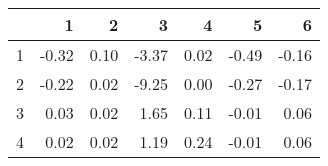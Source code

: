 \begin{table}[ht]
\centering
\begin{tabular}{rrrrrrr}
  \hline
 & 1 & 2 & 3 & 4 & 5 & 6 \\ 
  \hline
1 & -0.32 & 0.10 & -3.37 & 0.02 & -0.49 & -0.16 \\ 
  2 & -0.22 & 0.02 & -9.25 & 0.00 & -0.27 & -0.17 \\ 
  3 & 0.03 & 0.02 & 1.65 & 0.11 & -0.01 & 0.06 \\ 
  4 & 0.02 & 0.02 & 1.19 & 0.24 & -0.01 & 0.06 \\ 
   \hline
\end{tabular}
\end{table}
